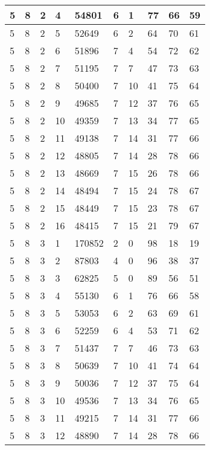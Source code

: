 \begin{table}[!ht]
\begin{tabular}{|l|l|l|l|l|l|l|l|l|l|}
        5 & 8 & 2 & 4 & 54801 & 6 & 1 & 77 & 66 & 59 \\ \hline
        5 & 8 & 2 & 5 & 52649 & 6 & 2 & 64 & 70 & 61 \\ \hline
        5 & 8 & 2 & 6 & 51896 & 7 & 4 & 54 & 72 & 62 \\ \hline
        5 & 8 & 2 & 7 & 51195 & 7 & 7 & 47 & 73 & 63 \\ \hline
        5 & 8 & 2 & 8 & 50400 & 7 & 10 & 41 & 75 & 64 \\ \hline
        5 & 8 & 2 & 9 & 49685 & 7 & 12 & 37 & 76 & 65 \\ \hline
        5 & 8 & 2 & 10 & 49359 & 7 & 13 & 34 & 77 & 65 \\ \hline
        5 & 8 & 2 & 11 & 49138 & 7 & 14 & 31 & 77 & 66 \\ \hline
        5 & 8 & 2 & 12 & 48805 & 7 & 14 & 28 & 78 & 66 \\ \hline
        5 & 8 & 2 & 13 & 48669 & 7 & 15 & 26 & 78 & 66 \\ \hline
        5 & 8 & 2 & 14 & 48494 & 7 & 15 & 24 & 78 & 67 \\ \hline
        5 & 8 & 2 & 15 & 48449 & 7 & 15 & 23 & 78 & 67 \\ \hline
        5 & 8 & 2 & 16 & 48415 & 7 & 15 & 21 & 79 & 67 \\ \hline
        5 & 8 & 3 & 1 & 170852 & 2 & 0 & 98 & 18 & 19 \\ \hline
        5 & 8 & 3 & 2 & 87803 & 4 & 0 & 96 & 38 & 37 \\ \hline
        5 & 8 & 3 & 3 & 62825 & 5 & 0 & 89 & 56 & 51 \\ \hline
        5 & 8 & 3 & 4 & 55130 & 6 & 1 & 76 & 66 & 58 \\ \hline
        5 & 8 & 3 & 5 & 53053 & 6 & 2 & 63 & 69 & 61 \\ \hline
        5 & 8 & 3 & 6 & 52259 & 6 & 4 & 53 & 71 & 62 \\ \hline
        5 & 8 & 3 & 7 & 51437 & 7 & 7 & 46 & 73 & 63 \\ \hline
        5 & 8 & 3 & 8 & 50639 & 7 & 10 & 41 & 74 & 64 \\ \hline
        5 & 8 & 3 & 9 & 50036 & 7 & 12 & 37 & 75 & 64 \\ \hline
        5 & 8 & 3 & 10 & 49536 & 7 & 13 & 34 & 76 & 65 \\ \hline
        5 & 8 & 3 & 11 & 49215 & 7 & 14 & 31 & 77 & 66 \\ \hline
        5 & 8 & 3 & 12 & 48890 & 7 & 14 & 28 & 78 & 66 \\ \hline

\end{tabular}
\end{table}
